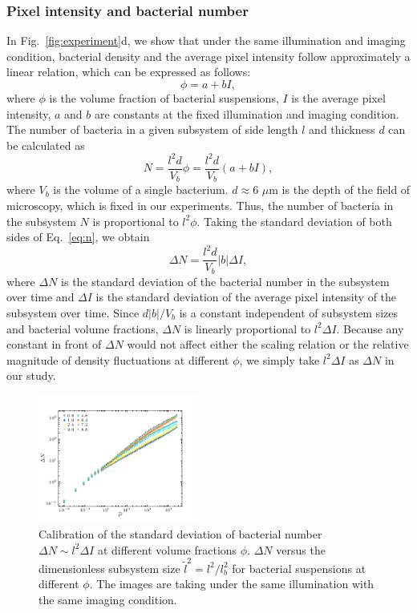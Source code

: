 \documentclass[9pt,twoside,lineno]{pnas-new}
\begin{document}
\subsubsection{Pixel intensity and bacterial number}
In Fig.~\ref{fig:experiment}d, we show that under the same illumination and imaging condition, bacterial density and the average pixel intensity follow approximately a linear relation, which can be expressed as follows:
\begin{equation}
\label{eq:phi-I-relation}
\phi = a + bI,
\end{equation}
where $\phi$ is the volume fraction of bacterial suspensions, $I$ is the average pixel intensity, $a$ and $b$ are constants at the fixed illumination and imaging condition. The number of bacteria in a given subsystem of side length $l$ and thickness $d$ can be calculated as
\begin{equation}
\label{eq:n}
N = \frac{l^2d}{V_b} \phi = \frac{l^2d}{V_b} (a+bI),
\end{equation}
where $V_b$ is the volume of a single bacterium. $d \approx 6$ $\mu$m is the depth of the field of microscopy, which is fixed in our experiments. Thus, the number of bacteria in the subsystem $N$ is proportional to $l^2 \phi$. Taking the standard deviation of both sides of Eq.~\ref{eq:n}, we obtain
\begin{equation}
\label{intensity-number}
\Delta N = \frac{l^2 d}{V_b}|b|\Delta I,
\end{equation}
where $\Delta N$ is the standard deviation of the bacterial number in the subsystem over time and $\Delta I$ is the standard deviation of the average pixel intensity of the subsystem over time. Since $d|b|/V_b$ is a constant independent of subsystem sizes and bacterial volume fractions, $\Delta N$ is linearly proportional to $l^2\Delta I$. Because any constant in front of $\Delta N$ would not affect either the scaling relation or the relative magnitude of density fluctuations at different $\phi$, we simply take $l^2\Delta I$ as $\Delta N$ in our study.


\begin{figure}[t]
	\begin{center}
		\includegraphics[width=0.47\textwidth]{fig-8.pdf}
		\caption[Density autocorrelation]
		{Calibration of the standard deviation of bacterial number $\Delta N \sim l^2\Delta I$ at different volume fractions $\phi$. $\Delta N$ versus the dimensionless subsystem size $\tilde{l}^2 = l^2/l_b^2$ for bacterial suspensions at different $\phi$. The images are taking under the same illumination with the same imaging condition.
		}
		\label{fig:same-conditions}
	\end{center}
\end{figure}
\end{document}
